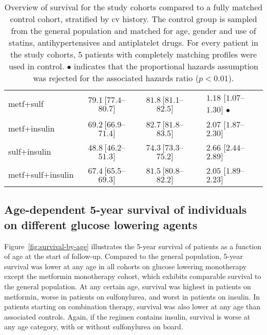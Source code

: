\begin{table}[!h]
\begin{tabular}{lcccl}
metf+sulf				& $79.1\ [77.4$--$80.7]$ & $81.8\ [81.1$--$82.5]$ & & $1.18$ $[1.07$--$1.30]$ $\bullet$ \\ %
metf+insulin			& $69.2\ [66.9$--$71.4]$ & $82.7\ [81.8$--$83.5]$ & & $2.07$ $[1.87$--$2.30]$ \\ %
sulf+insulin			& $48.8\ [46.2$--$51.3]$ & $74.3\ [73.3$--$75.2]$ & & $2.66$ $[2.44$--$2.89]$ \\ %
metf+sulf+insulin		& $67.4\ [65.5$--$69.3]$ & $81.5\ [80.8$--$82.2]$ & & $2.05$ $[1.89$--$2.23]$ \\ %
\bottomrule
\end{tabular}
\caption{Overview of survival for the study cohorts compared to a fully matched control cohort, stratified by cv history. The control group is sampled from the general population and matched for age, gender and use of statins, antihypertensives and antiplatelet drugs. For every patient in the study cohorts, 5 patients with completely matching profiles were used in control. $\bullet$ indicates that the proportional hazards assumption was rejected for the associated hazards ratio ($p<0.01$).} \label{table:survival-results}
\end{table}


\subsection{Age-dependent 5-year survival of individuals on different glucose lowering agents}
Figure~\ref{fig:survival-by-age} illustrates the 5-year survival of patients as a function of age at the start of follow-up. Compared to the general population, 5-year survival was lower at any age in all cohorts on glucose lowering monotherapy except the metformin monotherapy cohort, which exhibits comparable survival to the general population. At any certain age, survival was highest in patients on metformin, worse in patients on sulfonylurea, and worst in patients on insulin. In patients starting on combination therapy, survival was also lower at any age than associated controls. Again, if the regimen contains insulin, survival is worse at any age category, with or without sulfonylurea on board. 



